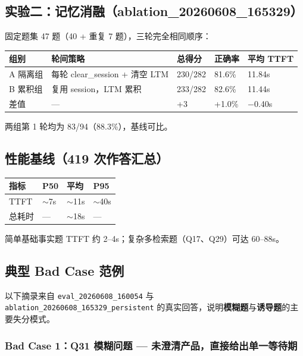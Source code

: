 \documentclass[11pt,a4paper]{ctexart}
\begin{document}
\subsection{实验二：记忆消融（ablation\_20260608\_165329）}

固定题集 47 题（40 + 重复 7 题），三轮完全相同顺序：

\begin{center}
\begin{tabular}{lllll}
\toprule
\textbf{组别} & \textbf{轮间策略} & \textbf{总得分} & \textbf{正确率} & \textbf{平均 TTFT} \\
\midrule
A 隔离组 & 每轮 clear\_session + 清空 LTM & 230/282 & 81.6\% & 11.84s \\
B 累积组 & 复用 session，LTM 累积 & 233/282 & 82.6\% & 11.44s \\
差值 & --- & +3 & +1.0\% & $-$0.40s \\
\bottomrule
\end{tabular}
\end{center}

两组第 1 轮均为 83/94（88.3\%），基线可比。

\subsection{性能基线（419 次作答汇总）}

\begin{center}
\begin{tabular}{llll}
\toprule
\textbf{指标} & \textbf{P50} & \textbf{平均} & \textbf{P95} \\
\midrule
TTFT & $\sim$7s & $\sim$11s & $\sim$40s \\
总耗时 & --- & $\sim$18s & --- \\
\bottomrule
\end{tabular}
\end{center}

简单基础事实题 TTFT 约 2--4s；复杂多检索题（Q17、Q29）可达 60--88s。

\subsection{典型 Bad Case 范例}

以下摘录来自 \texttt{eval\_20260608\_160054} 与 \texttt{ablation\_20260608\_165329\_persistent} 的真实回答，说明\textbf{模糊题}与\textbf{诱导题}的主要失分模式。

\subsubsection{Bad Case 1：Q31 模糊问题 — 未澄清产品，直接给出单一等待期}
\end{document}
